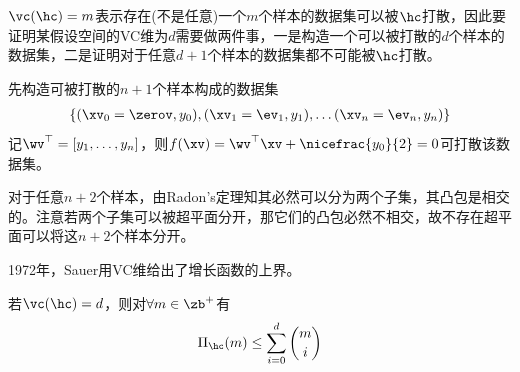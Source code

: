 \documentclass{ctexart}
\begin{document}
\begin{remark}
    $\vc(\hc) = m$表示存在(不是任意)一个$m$个样本的数据集可以被$\hc$打散，因此要证明某假设空间的VC维为$d$需要做两件事，一是构造一个可以被打散的$d$个样本的数据集，二是证明对于任意$d+1$个样本的数据集都不可能被$\hc$打散。
\end{remark}

\begin{example} [$\rb^n$中的超平面集合的VC维为$n+1$]
    先构造可被打散的$n+1$个样本构成的数据集
    \begin{align*}
        \{(\xv_0 = \zerov, y_0), (\xv_1 = \ev_1, y_1), \ldots (\xv_n = \ev_n, y_n)\}
    \end{align*}
    记$\wv^\top = [y_1,\ldots,y_n]$，则$f(\xv) = \wv^\top \xv + \nicefrac{y_0}{2} = 0$可打散该数据集。

    对于任意$n+2$个样本，由Radon's定理知其必然可以分为两个子集，其凸包是相交的。注意若两个子集可以被超平面分开，那它们的凸包必然不相交，故不存在超平面可以将这$n+2$个样本分开。
\end{example}

1972年，Sauer用VC维给出了增长函数的上界。

\begin{lemma} \label{lem: Sauer lemma}
    若$\vc(\hc) = d$，则对$\forall m \in \zb^+$有
    \begin{align*}
        \Pi_\hc(m) \le \sum_{i=0}^d \binom{m}{i}
    \end{align*}
\end{lemma}
\end{document}
